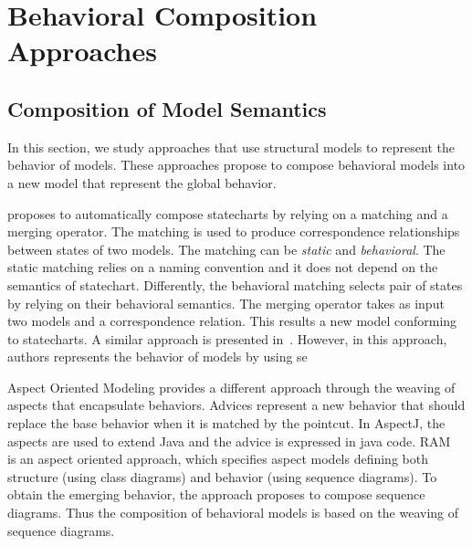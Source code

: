 \section{Behavioral Composition Approaches}

	
\subsection{Composition of Model Semantics}
In this section, we study approaches that use structural models to represent the behavior of models. These approaches propose to compose behavioral models into a new model that represent the global behavior.
		
\cite{compostatechartsbib} proposes to automatically compose statecharts by relying on a matching and a merging operator. The matching is used to produce correspondence relationships between states of two models. The matching can be \emph{static} and \emph{behavioral}. The static matching relies on a naming convention and it does not depend on the semantics of statechart. Differently, the behavioral matching selects pair of states by relying on their behavioral semantics. The merging operator takes as input two models and a correspondence relation. This results a new model conforming to statecharts. A similar approach is presented in~\cite{compoclassdiagrambib}. However, in this approach, authors represents the behavior of models by using se   
		 
Aspect Oriented Modeling provides a different approach through the weaving of aspects that encapsulate behaviors\cite{weavingbib}. Advices represent a new behavior that should replace the base behavior when it is matched by the pointcut. In AspectJ\cite{AspectJoverview}, the aspects are used to extend Java and the advice is expressed in java code. RAM~\cite{rambib,composdbib} is an aspect oriented approach, which specifies aspect models defining both structure (using class diagrams) and behavior (using sequence diagrams). To obtain the emerging behavior, the approach proposes to compose sequence diagrams. Thus the composition of behavioral models is based on the weaving of sequence diagrams.

